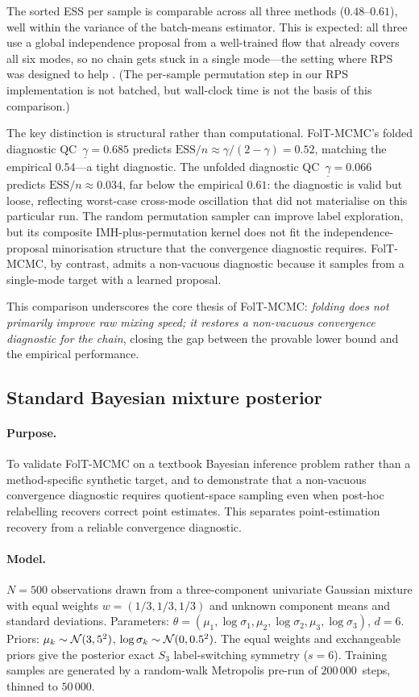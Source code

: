 The sorted ESS per sample is comparable across all three methods
($0.48$--$0.61$), well within the variance of the batch-means
estimator.  This is expected: all three use a global independence
proposal from a well-trained flow that already covers all six
modes, so no chain gets stuck in a single mode---the setting where
RPS was designed to help \citep{FruhwirthSchnatter2001}.
(The per-sample permutation step in our RPS implementation is
not batched, but wall-clock time is not the basis of this
comparison.)

The key distinction is structural rather than computational.
FolT-MCMC's folded diagnostic QC~$\underline{\gamma} = 0.685$ predicts
$\mathrm{ESS}/n \approx \gamma/(2-\gamma) = 0.52$, matching the
empirical $0.54$---a tight diagnostic.
The unfolded diagnostic QC~$\underline{\gamma} = 0.066$ predicts
$\mathrm{ESS}/n \approx 0.034$, far below the empirical $0.61$:
the diagnostic is valid but loose, reflecting worst-case
cross-mode oscillation that did not materialise on this particular
run.
The random permutation sampler can improve label exploration,
but its composite IMH-plus-permutation kernel does not fit the
independence-proposal minorisation structure that the convergence
diagnostic requires.  FolT-MCMC, by contrast, admits a non-vacuous
diagnostic because it samples from a single-mode target with a
learned proposal.

This comparison underscores the core thesis of FolT-MCMC:
\emph{folding does not primarily improve raw mixing speed; it
restores a non-vacuous convergence diagnostic for the chain},
closing the gap between the provable lower bound and the empirical
performance.


\subsection{Standard Bayesian mixture posterior}
\label{sec:exp_bayesian_mixture}

\paragraph{Purpose.}
To validate FolT-MCMC on a textbook Bayesian inference problem
rather than a method-specific synthetic target, and to demonstrate
that a non-vacuous convergence diagnostic requires quotient-space
sampling even when post-hoc relabelling recovers correct point
estimates.  This separates point-estimation recovery from
a reliable convergence diagnostic.

\paragraph{Model.}
$N = 500$ observations drawn from a three-component univariate
Gaussian mixture with equal weights $w = (1/3, 1/3, 1/3)$ and
unknown component means and standard deviations.
Parameters: $\theta = (\mu_1, \log\sigma_1, \mu_2, \log\sigma_2,
\mu_3, \log\sigma_3)$, $d = 6$.
Priors: $\mu_k \sim \mathcal{N}(3, 5^2)$,
$\log\sigma_k \sim \mathcal{N}(0, 0.5^2)$.
The equal weights and exchangeable priors give the posterior
exact $S_3$ label-switching symmetry ($s = 6$).
Training samples are generated by a random-walk Metropolis
pre-run of $200\,000$~steps, thinned to $50\,000$.


